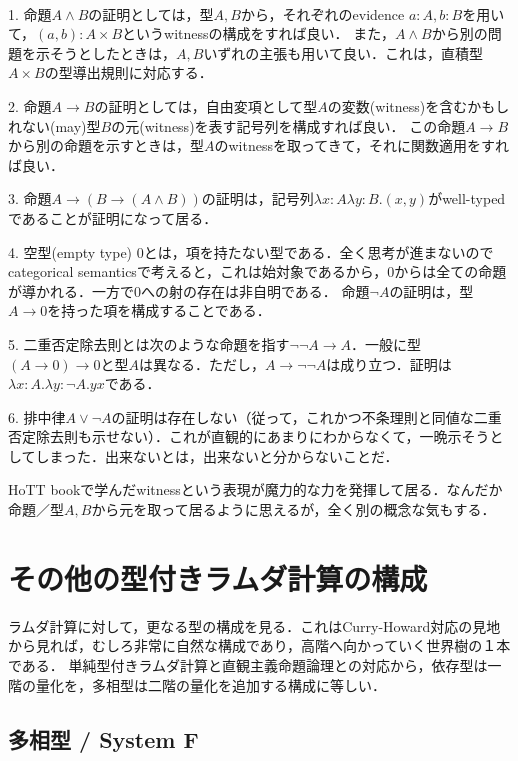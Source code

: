 \documentclass[uplatex, dvipdfmx]{jsreport}
\begin{document}
\begin{example}[証明の表現]　

    1. 命題$A\land B$の証明としては，型$A,B$から，それぞれのevidence $a:A,b:B$を用いて，$(a,b):A\times B$というwitnessの構成をすれば良い．
    また，$A\land B$から別の問題を示そうとしたときは，$A,B$いずれの主張も用いて良い．これは，直積型$A\times B$の型導出規則に対応する．

    2. 命題$A\to B$の証明としては，自由変項として型$A$の変数(witness)を含むかもしれない(may)型$B$の元(witness)を表す記号列を構成すれば良い．
    この命題$A\to B$から別の命題を示すときは，型$A$のwitnessを取ってきて，それに関数適用をすれば良い．

    3. 命題$A\to (B\to (A\land B))$の証明は，記号列$\lambda x:A\lambda y:B.(x,y)$がwell-typedであることが証明になって居る．

    4. 空型(empty type) $0$とは，項を持たない型である．全く思考が進まないのでcategorical semanticsで考えると，これは始対象であるから，$0$からは全ての命題が導かれる．一方で$0$への射の存在は非自明である．
    命題$\lnot A$の証明は，型$A\to 0$を持った項を構成することである．

    5. 二重否定除去則とは次のような命題を指す$\lnot\lnot A\to A$．一般に型$(A\to 0)\to 0$と型$A$は異なる．ただし，$A\to\lnot\lnot A$は成り立つ．証明は$\lambda x:A.\lambda y:\lnot A.yx$である．

    6. 排中律$A\lor\lnot A$の証明は存在しない（従って，これかつ不条理則と同値な二重否定除去則も示せない）．これが直観的にあまりにわからなくて，一晩示そうとしてしまった．出来ないとは，出来ないと分からないことだ．
\end{example}
\begin{remark}
    HoTT bookで学んだwitnessという表現が魔力的な力を発揮して居る．なんだか命題／型$A,B$から元を取って居るように思えるが，全く別の概念な気もする．
\end{remark}

\section{その他の型付きラムダ計算の構成}
ラムダ計算に対して，更なる型の構成を見る．これはCurry-Howard対応の見地から見れば，むしろ非常に自然な構成であり，高階へ向かっていく世界樹の１本である．
単純型付きラムダ計算と直観主義命題論理との対応から，依存型は一階の量化を，多相型は二階の量化を追加する構成に等しい．

\subsection{多相型 / System F}
\end{document}
